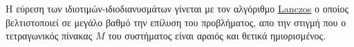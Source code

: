 %
Η εύρεση των ιδιοτιμών-ιδιοδιανυσμάτων γίνεται με τον αλγόριθμο \href{https://en.wikipedia.org/wiki/Lanczos_algorithm}{\textlatin{Lanczos}}\textlatin{\cite{lanczos}} ο οποίος βελτιστοποιεί σε μεγάλο βαθμό την επίλυση του προβλήματος, απο την στιγμή που ο τετραγωνικός πίνακας $M$ του συστήματος είναι αραιός και θετικά ημιορισμένος.